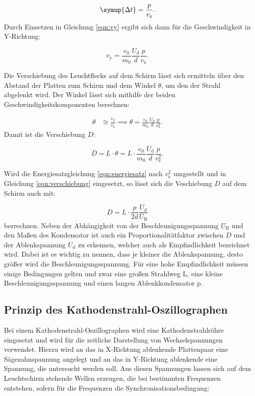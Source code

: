 \begin{equation}
\symup{\Delta{t}} = \frac{p}{v_{\text{z}}}.
\end{equation}
Durch Einsetzen in Gleichung \ref{eqn:vy} ergibt sich dann für die Geschwindigkeit in Y-Richtung:

\begin{equation}
v_{\text{y}} = \frac{e_0}{m_0} \frac{U_{\text{d}}}{d} \frac{p}{v_{\text{z}}}.
\end{equation}

Die Verschiebung des Leuchtflecks auf dem Schirm lässt sich ermitteln über den Abstand der Platten zum Schirm und dem Winkel $\theta$, um den der Strahl abgelenkt wird.
Der Winkel lässt sich mithilfe der beiden Geschwindigkeitskomponenten berechnen:

\begin{equation}
\begin{aligned}
\theta &\cong \frac{v_{\text{y}}}{v_{\text{z}}}
\implies \theta = \frac{e_0}{m_0} \frac{U_{\text{d}}}{d} \frac{p}{v_{\text{z}}^2}.
\end{aligned}
\end{equation}
Damit ist die Verschiebung $D$:

\begin{equation}
D = L \cdot \theta = L \cdot \frac{e_0}{m_0} \frac{U_{\text{d}}}{d} \frac{p}{v_{\text{z}}^2}.
\label{eqn:verschiebung}
\end{equation}

Wird die Energiesatzgleichung \ref{eqn:energiesatz} nach $v_{\text{z}}^2$ umgestellt und in Gleichung \ref{eqn:verschiebung} eingesetzt, so lässt sich die Veschiebung $D$ auf dem Schirm auch mit:

\begin{equation}
D = L \cdot \frac{p}{2d} \frac{U_{\text{d}}}{U_{\text{B}}}
\end{equation}
berrechnen. Neben der Abhängigkeit von der Beschleunigungsspannung $U_{\text{B}}$ und den Maßen des Kondensator ist auch ein Proportionalitätfaktor zwischen $D$ und der Ablenkspannung $U_{\text{d}}$ zu erkennen, welcher auch als Empfindlichkeit bezeichnet wird. Dabei ist es wichtig zu nennen, dass je kleiner die Ablenkspannung, desto größer wird die Beschleunigungsspannung.
Für eine hohe Empfindlichkeit müssen einige Bedingungen gelten und zwar eine großen Strahlweg L, eine kleine Beschleunigungsspannung und einen langen Ablenkkondensator p.

\subsection{Prinzip des Kathodenstrahl-Oszillographen}
Bei einem Kathodenstrahl-Oszillographen wird eine Kathodenstrahlröhre eingesetzt und wird für die zeitliche Darstellung von Wechselspannungen verwendet. Hierzu wird an das in X-Richtung ablenkende Plattenpaar 
eine Sägezahnspannung angelegt und an das in Y-Richtung ablenkende eine Spannung, die untersucht werden soll. Aus diesen Spannungen lassen sich auf dem Leuchtschirm stehende Wellen erzeugen, die bei bestimmten Frequenzen entstehen, sofern für die 
Frequenzen die Synchronisationsbedingung:

